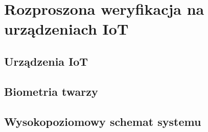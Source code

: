 %
%


\newpage
\section[general]{Rozproszona weryfikacja na urządzeniach IoT}
\subsection{Urządzenia IoT}
\subsection{Biometria twarzy}
\subsection{Wysokopoziomowy schemat systemu}

